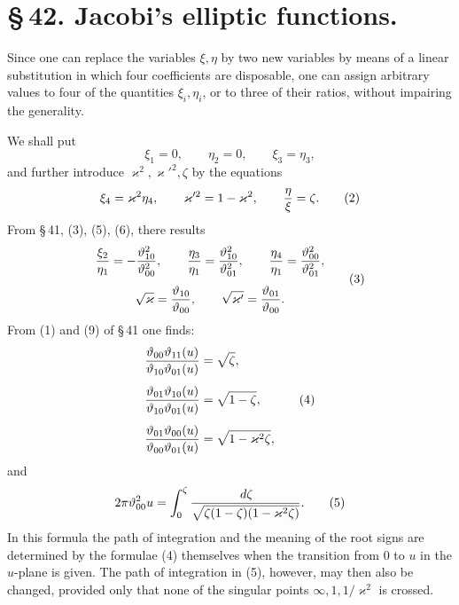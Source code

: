 \documentclass[11pt]{article}
\providecommand{\dd}{\,d}
\providecommand{\tht}{\vartheta}
\begin{document}
\section*{\S\,42. Jacobi's elliptic functions.}

Since one can replace the variables $\xi,\eta$ by two new variables by means of a linear substitution in which four coefficients are disposable, one can assign arbitrary values to four of the quantities $\xi_i,\eta_i$, or to three of their ratios, without impairing the generality.

We shall put
\begin{equation}
\xi_1=0,
\qquad \eta_2=0,
\qquad \xi_3=\eta_3,
\tag{1}
\end{equation}
and further introduce $\varkappa^2,\varkappa'^2,\zeta$ by the equations
\begin{equation}
\xi_4=\varkappa^2\eta_4,
\qquad
\varkappa'^2=1-\varkappa^2,
\qquad
{\eta\over\xi}=\zeta.
\tag{2}
\end{equation}
From \S\,41, (3), (5), (6), there results
\begin{equation}
\begin{gathered}
{\xi_2\over\eta_1}=-{\tht_{10}^{2}\over\tht_{00}^{2}},
\qquad
{\eta_3\over\eta_1}={\tht_{10}^{2}\over\tht_{01}^{2}},
\qquad
{\eta_4\over\eta_1}={\tht_{00}^{2}\over\tht_{01}^{2}},\\[0.4em]
\sqrt{\varkappa}={\tht_{10}\over\tht_{00}},
\qquad
\sqrt{\varkappa'}={\tht_{01}\over\tht_{00}}.
\end{gathered}
\tag{3}
\end{equation}
From (1) and (9) of \S\,41 one finds:
\begin{equation}
\begin{aligned}
{\tht_{00}\tht_{11}(u)\over \tht_{10}\tht_{01}(u)}&=\sqrt\zeta,\\[0.4em]
{\tht_{01}\tht_{10}(u)\over \tht_{10}\tht_{01}(u)}&=\sqrt{1-\zeta},\\[0.4em]
{\tht_{01}\tht_{00}(u)\over \tht_{00}\tht_{01}(u)}&=\sqrt{1-\varkappa^2\zeta},
\end{aligned}
\tag{4}
\end{equation}
and
\begin{equation}
2\pi\tht_{00}^{2}u=\int_0^\zeta {\dd\zeta\over \sqrt{\zeta(1-\zeta)(1-\varkappa^2\zeta)}}.
\tag{5}
\end{equation}
In this formula the path of integration and the meaning of the root signs are determined by the formulae (4) themselves when the transition from $0$ to $u$ in the $u$-plane is given. The path of integration in (5), however, may then also be changed, provided only that none of the singular points $\infty,1,1/\varkappa^2$ is crossed.
\end{document}
